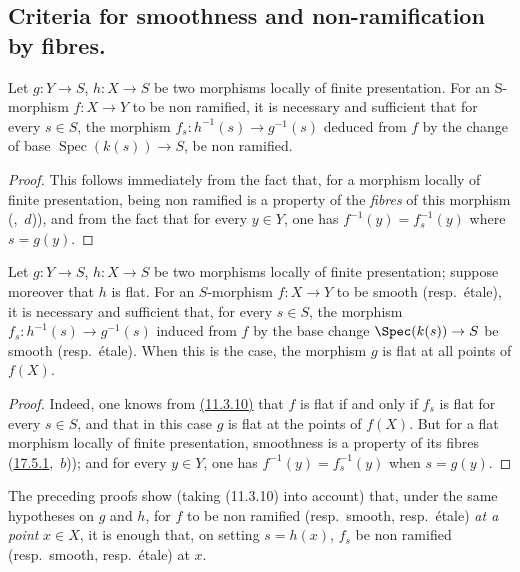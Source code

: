 \subsection{Criteria for smoothness and non-ramification by fibres.}
\label{subsection:IV.17.8}
\label{IV.17.8}


\begin{proposition}[17.8.1]
\label{IV.17.8.1}
Let $g:Y\to S$, $h:X\to S$ be two morphisms locally of finite presentation.
For an S-morphism $f:X\to Y$ to be non ramified, it is necessary and sufficient that for every $s\in S$, the morphism $f_s:h^{-1}(s)\to g^{-1}(s)$ deduced from $f$ by the change of base $\operatorname{Spec}(k(s))\to S$, be non ramified.
\end{proposition}

\begin{proof}
This follows immediately from the fact that, for a morphism locally of finite presentation, being non ramified is a property of the \emph{fibres} of this morphism (,~$d$)), and from the fact that for every $y\in Y$, one has $f^{-1}(y)=f_s^{-1}(y)$ where $s=g(y)$.
\end{proof}

\begin{proposition}[17.8.2]
\label{IV.17.8.2}
Let $g:Y\to S$, $h:X\to S$ be two morphisms locally of finite presentation; suppose moreover that $h$ is flat.
For an $S$-morphism $f:X\to Y$ to be smooth (resp.\ \'etale), it is necessary and sufficient that, for every $s\in S$, the morphism $f_s:h^{-1}(s)\to g^{-1}(s)$ induced from $f$ by the base change $\Spec(k(s))\to S$ be smooth (resp.\ \'etale).
When this is the case, the morphism $g$ is flat at all points of $f(X)$.
\end{proposition}

\begin{proof}
Indeed, one knows from {\hyperlink{ega4.c04.thm.11-3-10}{(11.3.10)}} that $f$ is flat if and only if $f_s$ is flat for every $s\in S$, and that in this case $g$ is flat at the points of $f(X)$.
But for a flat morphism locally of finite presentation, smoothness is a property of its fibres ({\hyperlink{ega4.c04.thm.17-5-1}{17.5.1}},~$b$)); and for every $y\in Y$, one has $f^{-1}(y)=f_s^{-1}(y)$ when $s=g(y)$.
\end{proof}

\begin{remark}[17.8.3]
\label{IV.17.8.3}
The preceding proofs show (taking (11.3.10) into account) that, under the same hypotheses on $g$ and $h$, for $f$ to be non ramified (resp.\ smooth, resp.\ \'etale) \emph{at a point} $x\in X$, it is enough that, on setting $s=h(x)$, $f_s$ be non ramified (resp.\ smooth, resp.\ \'etale) at $x$.
\end{remark}


